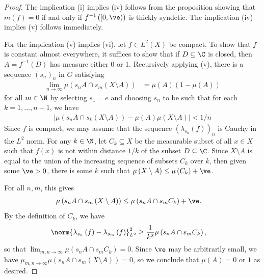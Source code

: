 \documentclass[10pt]{mypackage}
\begin{document}
\begin{proof}
  The implication (i) implies (iv) follows from the proposition showing that $m(f) = 0$ if and only if $f^{-1}\left( \left[ 0,\ve \right) \right)$ is thickly syndetic. The implication (iv) implies (v) follows immediately.

  For the implication (v) implies (vi), let $f\in L^2\left( X \right)$ be compact. To show that $f$ is constant almost everywhere, it suffices to show that if $D\subseteq \C$ is closed, then $A = f^{-1}\left( D \right)$ has measure either $0$ or $1$. Recursively applying (v), there is a sequence $\left( s_n \right)_n$ in $G$ satisfying
  \begin{align*}
    \lim_{n\rightarrow\infty} \mu\left( s_nA \cap s_m\left( X\setminus A \right) \right) &= \mu\left( A \right)\left( 1-\mu\left( A \right) \right)
  \end{align*}
  for all $m\in \N$ by selecting $s_1 = e$ and choosing $s_n$ to be such that for each $k=1,\dots,n-1$, we have  
  \begin{align*}
    \left\vert \mu\left( s_nA\cap s_k\left( X\setminus A \right) \right) - \mu\left( A \right)\mu\left( X\setminus A \right) \right\vert < 1/n
  \end{align*}
  Since $f$ is compact, we may assume that the sequence $\left( \lambda_{s_n}\left( f \right) \right)_{n}$ is Cauchy in the $L^2$ norm. For any $k\in \N$, let $C_k\subseteq X$ be the measurable subset of all $x\in X$ such that $f(x)$ is not within distance $1/k$ of the subset $D\subseteq \C$. Since $X\setminus A$ is equal to the union of the increasing sequence of subsets $C_k$ over $k$, then given some $\ve > 0$, there is some $k$ such that $\mu\left( X\setminus A \right) \leq \mu\left( C_k \right) + \ve$.

  For all $n,m$, this gives
  \begin{align*}
    \mu\left( s_nA\cap s_m\left( X\setminus A \right) \right) &\leq \mu\left( s_nA\cap s_mC_k \right) + \ve.
  \end{align*}
  By the definition of $C_k$, we have
  \begin{align*}
    \norm{\lambda_{s_n}\left( f \right)-\lambda_{s_m}\left( f \right)}_{L^2}^2 &\geq \frac{1}{k^2}\mu\left( s_nA\cap s_mC_k \right),
  \end{align*}
  so that $\lim_{m,n\rightarrow\infty}\mu\left( s_nA\cap s_mC_k \right) = 0$. Since $\ve$ may be arbitrarily small, we have $\mu_{m,n\rightarrow \infty} \mu\left( s_nA\cap s_m\left( X\setminus A \right) \right) = 0$, so we conclude that $\mu\left( A \right) = 0$ or $1$ as desired.


\end{proof}
\end{document}
